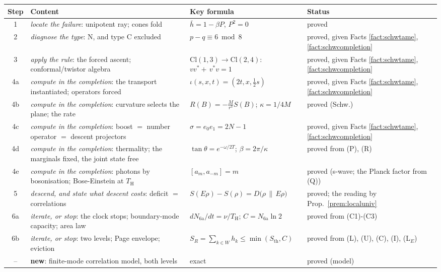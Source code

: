 \documentclass[11pt]{article}
\theoremstyle{definition}
\newcommand{\Cl}{\mathrm{Cl}}
\newcommand{\hb}{\bar{h}}
\renewcommand{\TH}{T_{\mathrm{H}}} %
\newcommand{\Sth}{S_{\mathrm{th}}}
\newcommand{\rel}[2]{D\bigl(#1 \,\|\, #2\bigr)}
\begin{document}
\begin{table}[htbp]
\centering
\footnotesize
\begin{tabular}{c>{\raggedright\arraybackslash}p{4.7cm}>{\raggedright\arraybackslash}p{4.6cm}l}
\toprule
Step & Content & Key formula & Status \\
\midrule
1 & \emph{locate the failure}: unipotent ray; cones fold & $\hb = 1 - \beta P$, $P^2 = 0$ & proved \\
2 & \emph{diagnose the type}: N, and type C excluded & $p - q \equiv 6 \bmod 8$ & proved, given Facts \ref{fact:schwtame}, \ref{fact:schwcompletion} \\
3 & \emph{apply the rule}: the forced ascent; conformal/twistor algebra & $\Cl(1,3) \to \Cl(2,4)$: $vv^* {+}\, v^*v = 1$ & proved, given Facts \ref{fact:schwtame}, \ref{fact:schwcompletion} \\
4a & \emph{compute in the completion}: the transport instantiated; operators forced & $\iota(s,x,t) = (2t, x, \tfrac12 s)$ & proved, given Facts \ref{fact:schwtame}, \ref{fact:schwcompletion} \\
4b & \emph{compute in the completion}: curvature selects the plane; the rate & $R(B) = -\tfrac{M}{r^3}S(B)$; $\kappa = 1/4M$ & proved (Schw.) \\
4c & \emph{compute in the completion}: boost $=$ number operator $=$ descent projectors & $\sigma = e_0 e_1 = 2N - 1$ & proved, given Facts \ref{fact:schwtame}, \ref{fact:schwcompletion} \\
4d & \emph{compute in the completion}: thermality; the marginals fixed, the joint state free & $\tan\theta = e^{-\omega/2T}$; $\beta = 2\pi/\kappa$ & proved from (P), (R) \\
4e & \emph{compute in the completion}: photons by bosonisation; Bose-Einstein at $\TH$ & $[a_m, a_{-m}] = m$ & proved (s-wave; the Planck factor from (Q)) \\
5 & \emph{descend, and state what descent costs}: deficit $=$ correlations & $S(E\rho) - S(\rho) = \rel{\rho}{E\rho}$ & proved; the reading by Prop.~\ref{prem:localuniv} \\
6a & \emph{iterate, or stop}: the clock stops; boundary-mode capacity; area law & $dN_{\mathrm{6a}}/dt = \nu/\TH$; $C = N_{\mathrm{6a}}\ln 2$ & proved from (C1)-(C3) \\
6b & \emph{iterate, or stop}: two levels; Page envelope; eviction & $S_R = \sum_{k \in W} h_k \leq \min(\Sth, C)$ & proved from (L), (U), (C), (I), (L$_E$) \\
\midrule
-- & \textbf{new}: finite-mode correlation model, both levels & exact & proved (model) \\

\end{tabular}
\end{table}
\end{document}

